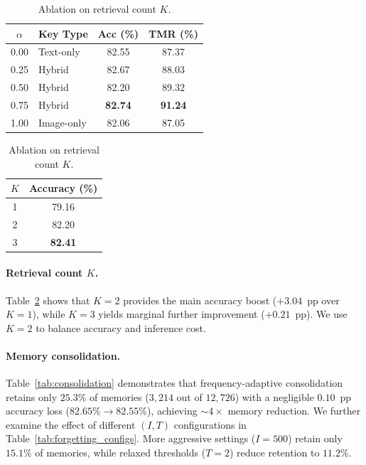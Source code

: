 \documentclass{article}
\begin{document}
\begin{table}[t]
  \centering
  \begin{minipage}[t]{0.48\textwidth}
    \centering
    \caption{Ablation on mixing coefficient $\alpha$.}
    \label{tab:abl_alpha}
    \begin{tabular}{@{}clcc@{}}
      \toprule
      $\alpha$ & Key Type & Acc (\%) & TMR (\%) \\
      \midrule
      0.00 & Text-only  & 82.55 & 87.37 \\
      0.25 & Hybrid     & 82.67 & 88.03 \\
      0.50 & Hybrid     & 82.20 & 89.32 \\
      0.75 & Hybrid     & \textbf{82.74} & \textbf{91.24} \\
      1.00 & Image-only & 82.06 & 87.05 \\
      \bottomrule
    \end{tabular}
  \end{minipage}
  \hfill
  \begin{minipage}[t]{0.48\textwidth}
    \centering
    \caption{Ablation on retrieval count $K$.}
    \label{tab:abl_topk}
    \begin{tabular}{@{}cc@{}}
      \toprule
      $K$ & Accuracy (\%) \\
      \midrule
      1 & 79.16 \\
      2 & 82.20 \\
      3 & \textbf{82.41} \\
      \bottomrule
    \end{tabular}
  \end{minipage}
\end{table}

\paragraph{Retrieval count $K$.}
Table~\ref{tab:abl_topk} shows that $K\!=\!2$ provides the main accuracy boost ($+3.04$~pp over $K\!=\!1$), while $K\!=\!3$ yields marginal further improvement ($+0.21$~pp). We use $K\!=\!2$ to balance accuracy and inference cost.

\paragraph{Memory consolidation.}
Table~\ref{tab:consolidation} demonstrates that frequency-adaptive consolidation retains only $25.3\%$ of memories ($3{,}214$ out of $12{,}726$) with a negligible $0.10$~pp accuracy loss ($82.65\% \to 82.55\%$), achieving $\sim\!4\times$ memory reduction. We further examine the effect of different $(I, T)$ configurations in Table~\ref{tab:forgetting_configs}. More aggressive settings ($I\!=\!500$) retain only $15.1\%$ of memories, while relaxed thresholds ($T\!=\!2$) reduce retention to $11.2\%$.
\end{document}
